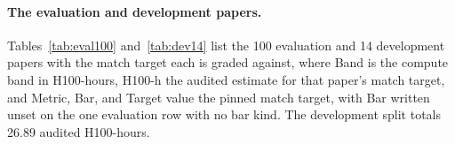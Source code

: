 \newpage  %
\paragraph{The evaluation and development papers.} Tables~\ref{tab:eval100}
and~\ref{tab:dev14} list the 100 evaluation and 14 development papers with the
match target each is graded against, where Band is the compute band in
H100-hours, H100-h the audited estimate for that paper's match target, and Metric, Bar,
and Target value the pinned match target, with Bar written unset on the one
evaluation row with no bar kind. The
development split totals 26.89 audited H100-hours.


